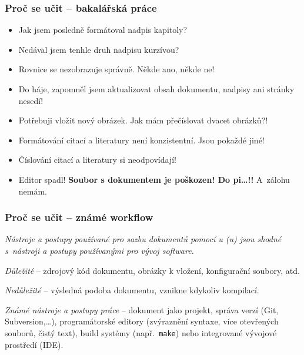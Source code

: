 \begin{frame}
	\frametitle{Proč se učit  -- bakalářská práce}
	\begin{itemize}
		\item Jak jsem posledně formátoval nadpis kapitoly?
		\item Nedával jsem tenhle druh nadpisu kurzívou?
		\item Rovnice se nezobrazuje správně. Někde ano, někde ne!
		\item Do háje, zapomněl jsem aktualizovat obsah dokumentu, nadpisy ani stránky nesedí!
		\item Potřebuji vložit nový obrázek. Jak mám přečíslovat dvacet obrázků?!
		\item Formátování citací a literatury není konzistentní. Jsou pokaždé jiné!
		\item Číslování citací a literatury si neodpovídají!
		\item Editor spadl! \alert{\textbf{Soubor s dokumentem je poškozen! Do pi\ldots!!}} A~zálohu nemám.
	\end{itemize}
\end{frame}


\begin{frame}
	\frametitle{Proč se učit  -- známé workflow}
	\begin{center}
		\emph{Nástroje a postupy používané pro sazbu dokumentů pomocí u (u) jsou shodné s~nástroji a postupy používanými pro vývoj software.}
	\end{center}
	\emph{Důležité} -- zdrojový kód dokumentu, obrázky k vložení, konfigurační soubory, atd.\par
	\emph{Nedůležité} -- výsledná podoba dokumentu, vznikne kdykoliv kompilací.\par
	\emph{Známé nástroje a postupy práce} -- dokument jako projekt, správa verzí (Git, Subversion,\ldots), programátorské editory (zvýraznění syntaxe, více otevřených souborů, čistý text), build systémy (např.\ \texttt{make}) nebo integrované vývojové prostředí (IDE).
\end{frame}


